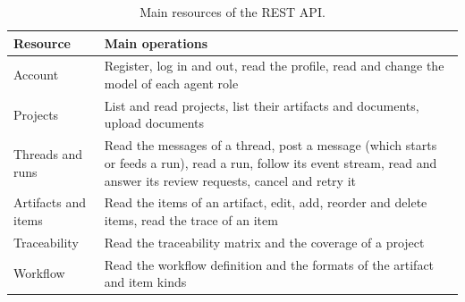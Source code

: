 \begin{table}[H]
    \centering
    \caption{Main resources of the REST API.}
    \label{tab:sd-api}
    \begin{tabularx}{\linewidth}{|l|X|}
        \hline
        \textbf{Resource} & \textbf{Main operations} \\
        \hline
        Account & Register, log in and out, read the profile, read and change the model of each agent role \\
        Projects & List and read projects, list their artifacts and documents, upload documents \\
        Threads and runs & Read the messages of a thread, post a message (which starts or feeds a run), read a run, follow its event stream, read and answer its review requests, cancel and retry it \\
        Artifacts and items & Read the items of an artifact, edit, add, reorder and delete items, read the trace of an item \\
        Traceability & Read the traceability matrix and the coverage of a project \\
        Workflow & Read the workflow definition and the formats of the artifact and item kinds \\
        \hline
    \end{tabularx}
\end{table}
